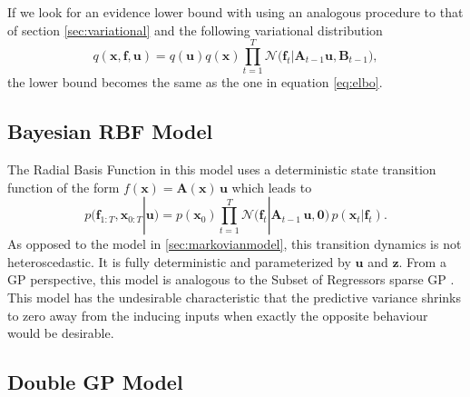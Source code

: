 \documentclass{article} %
\newcommand{\n}[1]{\mathbf{#1}}
\newcommand{\x}{\mathbf{x}}
\begin{document}
If we look for an evidence lower bound with using an analogous procedure to that of section \ref{sec:variational} and the following variational distribution
\begin{equation}
q(\x,\n{f},\n{u}) = q(\n{u}) q(\x) \prod_{t=1}^T \mathcal{N}\big(\n{f}_t | \n{A}_{t-1} \n{u}, \n{B}_{t-1} \big),
\end{equation}
the lower bound becomes the same as the one in equation \eqref{eq:elbo}.


\subsection{Bayesian RBF Model}

The Radial Basis Function in this model uses a deterministic state transition function of the form $f(\x) =  \n{A}(\x) \,\n{u}$ which leads to
\begin{equation}
	 p(\n{f}_{1:T} ,\x_{0:T} |  \n{u})  = p(\x_0) \prod_{t=1}^T \mathcal{N}\big(\n{f}_t | \n{A}_{t-1} \, \n{u}, \n{0} \big) \,  p(\x_t | \n{f}_t) .
\end{equation}
As opposed to the model in \ref{sec:markovianmodel}, this transition dynamics is not heteroscedastic. It is fully deterministic and parameterized by $\n{u}$ and $\n{z}$. From a GP perspective, this model is analogous to the Subset of Regressors sparse GP \citep{QuiRas05}. This model has the undesirable characteristic that the predictive variance shrinks to zero away from the inducing inputs when exactly the opposite behaviour would be desirable. 

\subsection{Double GP Model}
\end{document}
